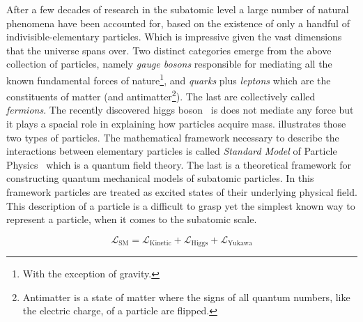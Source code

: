 After a few decades of research in the subatomic level a large number of natural phenomena have been accounted
for, based on the existence of only a handful of indivisible-elementary particles. Which is impressive given the vast dimensions that the
universe spans over. Two distinct categories emerge from the above collection of particles, namely {\it gauge
bosons} responsible for mediating all the known fundamental forces of
nature\footnote{With the exception of gravity.}, and {\it quarks} plus {\it leptons} which are the
constituents of matter
(and antimatter\footnote{Antimatter is a state of matter where the signs of all quantum numbers, like the electric charge, of a particle are flipped.}).
The last are collectively called {\it fermions}. The recently discovered higgs boson~\cite{higgs-cms,higgs-atlas} is does not mediate
any force but it plays a spacial role in explaining how particles acquire mass.  illustrates those two types of particles.
The mathematical framework necessary to describe the interactions between elementary particles is called \textit{Standard Model} of Particle
Physics~\cite{sm-glashow,sm-weinberg,sm-salam} which is a quantum field theory. The last is a theoretical framework for constructing quantum
mechanical models of subatomic particles. In this framework particles are treated as excited states of their underlying physical field.
This description of a particle is a difficult to grasp yet the simplest known way to represent a particle, when it comes to the subatomic scale.

\begin{equation}
\mathscr{L}_{\text{SM}} =
\mathscr{L}_{\text{Kinetic}} + \mathscr{L}_{\text{Higgs}} + \mathscr{L}_{\text{Yukawa}}
\label{lagrangian}
\end{equation}


